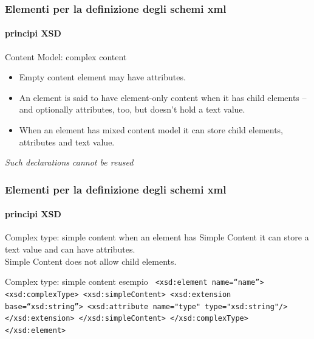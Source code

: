 \begin{frame}
	\frametitle{Elementi per la definizione degli schemi xml}
	\framesubtitle{principi XSD}
	\addtocounter{nframe}{1}

	\begin{block}{Content Model: complex content}
		\begin{itemize}
			\item Empty content element may have attributes.
			\item An element is said to have element-only content when it has child elements – and optionally attributes, too, but doesn't hold a text value.
			\item When an element has mixed content model it can store child elements, attributes and text value.
		\end{itemize}
	\end{block}
	\textit{Such declarations cannot be reused}
\end{frame}





\begin{frame}
	\frametitle{Elementi per la definizione degli schemi xml}
	\framesubtitle{principi XSD}
	\addtocounter{nframe}{1}

	\begin{block}{Complex type: simple content}
		when an element has Simple Content it can store a text value and can have attributes.
		\\Simple Content does not allow child elements.
	\end{block}

	\begin{block}{Complex type: simple content esempio}
		\texttt{
			<xsd:element name=``name''>
			<xsd:complexType>
			<xsd:simpleContent>
			<xsd:extension base=``xsd:string''>
			<xsd:attribute name="type" type="xsd:string"/>
			</xsd:extension>
			</xsd:simpleContent>
			</xsd:complexType>
			</xsd:element>
		}
	\end{block}
\end{frame}



